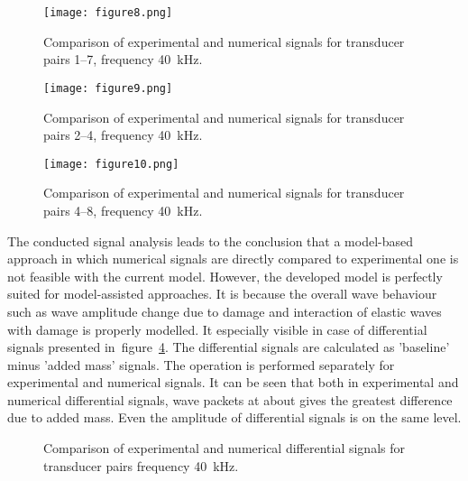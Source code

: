 \begin{figure} [h!]
	\centering	
\texttt{[image: figure8.png]}	
\caption{Comparison of experimental and numerical signals for transducer pairs 1--7, frequency 40~kHz.}
	\label{fig:path1_7}
\end{figure}
\begin{figure} [h!]
	\centering	
\texttt{[image: figure9.png]}	
\caption{Comparison of experimental and numerical signals for transducer pairs 2--4, frequency 40~kHz.}
	\label{fig:path2_4}
\end{figure}
\begin{figure} [h!]
	\centering	
\texttt{[image: figure10.png]}	
\caption{Comparison of experimental and numerical signals for transducer pairs 4--8, frequency 40~kHz.}
	\label{fig:path4_8}
\end{figure}

\clearpage
The conducted signal analysis leads to the conclusion that a model-based approach in which numerical signals are directly compared to experimental one is not feasible with the current model. However, the developed model is perfectly suited for model-assisted approaches. It is because the overall wave behaviour such as wave amplitude change due to damage and interaction of elastic waves with damage is properly modelled. It especially visible in case of differential signals presented in~figure~\ref{fig:path1_7_diff}. The differential signals are calculated as 'baseline' minus 'added mass' signals. The operation is performed separately for experimental and numerical signals. It can be seen that both in experimental and numerical differential signals, wave packets at about  gives the greatest difference due to added mass. Even the amplitude of differential signals is on the same level.

\begin{figure} [h!]
	\centering
{}
\caption{Comparison of experimental and numerical differential signals  for transducer pairs  frequency 40~kHz.}
	\label{fig:path1_7_diff}
\end{figure}
\begin{figure} [h!]
	\centering
		\caption{}
		\label{fig:path3_10_diff}
	\end{figure}
\begin{figure} [h!]
	\centering
		\caption{}
		\label{fig:path4_8_diff}
	\end{figure}

